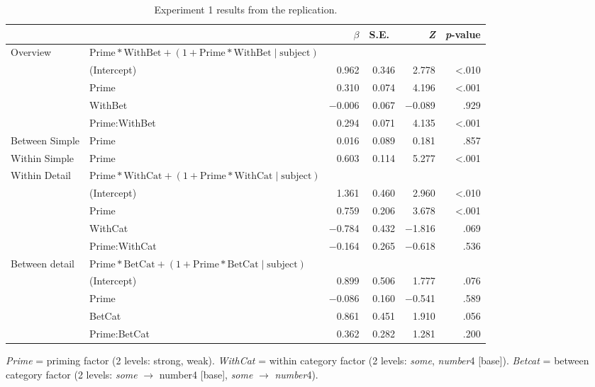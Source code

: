 \documentclass[10pt]{article}
\begin{document}
\begin{multicols}{2}
\begin{table}[ht]
  \caption{Experiment 1 results from the replication.}\vspace{-20pt}
  \label{tab:represults}
  \begin{center}
    \begin{tabular}{llrrrr}
      \hline
      & & \(\beta\) & S.E.\ & \emph{Z} & \emph{p}-value  \\
      \hline
      Overview & \(\text{Prime} * \text{WithBet} + (1 + \text{Prime} * \text{WithBet} \mid \text{subject})\) & & & \\
      & (Intercept)   & 0.962  & 0.346 &  2.778 & <.010 \\
      & Prime         & 0.310  & 0.074 &  4.196 & <.001 \\
      & WithBet       & \(-\)0.006 & 0.067 & \(-\)0.089 &  .929 \\
      & Prime:WithBet & 0.294  & 0.071 &  4.135 & <.001 \\
      Between Simple & Prime & 0.016 & 0.089 & 0.181 & .857  \\
      Within Simple  & Prime & 0.603 & 0.114 & 5.277 & <.001 \\
      Within Detail & \multicolumn{2}{l}{\(\text{Prime} * \text{WithCat} + (1 + \text{Prime} * \text{WithCat} \mid \text{subject})\)}  & & & \\
      & (Intercept)   &  1.361 & 0.460 &  2.960 & <.010 \\
      & Prime         &  0.759 & 0.206 &  3.678 & <.001 \\
      & WithCat       & \(-\)0.784 & 0.432 & \(-\)1.816 & .069  \\
      & Prime:WithCat & \(-\)0.164 & 0.265 & \(-\)0.618 & .536  \\
      Between detail & \multicolumn{2}{l}{\(\text{Prime} * \text{BetCat} + (1 + \text{Prime} * \text{BetCat} \mid \text{subject})\)}  & & & \\
      & (Intercept)  &  0.899 & 0.506 &  1.777 & .076 \\
      & Prime        & \(-\)0.086 & 0.160 & \(-\)0.541 & .589 \\
      & BetCat       & 0.861  & 0.451 &  1.910 & .056 \\
      & Prime:BetCat &  0.362 & 0.282 &  1.281 & .200 \\
      \hline
    \end{tabular}
\end{center}
  \emph{Prime} = priming factor (2 levels: strong, weak).
  \emph{WithCat} = within category factor (2 levels: \emph{some}, \emph{number}4 [base]).
  \emph{Betcat} = between category factor (2 levels: \emph{some} \(\rightarrow\) number4 [base], \emph{some} \(\rightarrow\) \emph{number}4).
\end{table}


\end{multicols}
\end{document}

